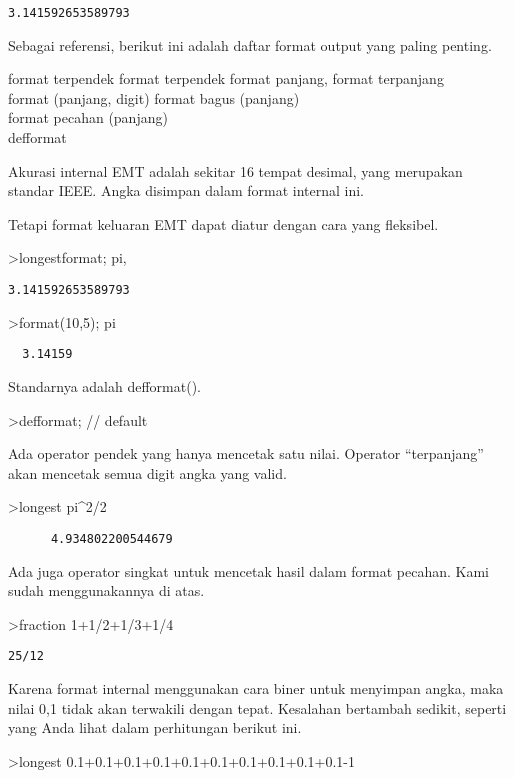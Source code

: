 \documentclass[
]{book}
\begin{document}
\begin{verbatim}
3.141592653589793
\end{verbatim}

Sebagai referensi, berikut ini adalah daftar format output yang paling penting.

format terpendek format terpendek format panjang, format terpanjang\\
format (panjang, digit) format bagus (panjang)\\
format pecahan (panjang)\\
defformat

Akurasi internal EMT adalah sekitar 16 tempat desimal, yang merupakan standar IEEE. Angka disimpan dalam format internal ini.

Tetapi format keluaran EMT dapat diatur dengan cara yang fleksibel.

\textgreater longestformat; pi,

\begin{verbatim}
3.141592653589793
\end{verbatim}

\textgreater format(10,5); pi

\begin{verbatim}
  3.14159 
\end{verbatim}

Standarnya adalah defformat().

\textgreater defformat; // default

Ada operator pendek yang hanya mencetak satu nilai. Operator ``terpanjang'' akan mencetak semua digit angka yang valid.

\textgreater longest pi\^{}2/2

\begin{verbatim}
      4.934802200544679 
\end{verbatim}

Ada juga operator singkat untuk mencetak hasil dalam format pecahan. Kami sudah menggunakannya di atas.

\textgreater fraction 1+1/2+1/3+1/4

\begin{verbatim}
25/12
\end{verbatim}

Karena format internal menggunakan cara biner untuk menyimpan angka, maka nilai 0,1 tidak akan terwakili dengan tepat. Kesalahan bertambah sedikit, seperti yang Anda lihat dalam perhitungan berikut ini.

\textgreater longest 0.1+0.1+0.1+0.1+0.1+0.1+0.1+0.1+0.1+0.1-1
\end{document}

